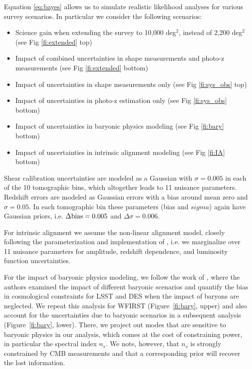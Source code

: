 Equation \ref{eq:bayes} allows us to simulate realistic likelihood analyses for various survey scenarios. In particular we consider the following scenarios:
\begin{itemize}
\item Science gain when extending the survey to 10,000 deg$^2$, instead of 2,200 deg$^2$ (see Fig \ref{fi:extended} top)
\item Impact of combined uncertainties in shape measurements and photo-z measurements (see Fig \ref{fi:extended} bottom)
\item Impact of uncertainties in shape measurements only (see Fig \ref{fi:sys_obs} top)
\item Impact of uncertainties in photo-z estimation only (see Fig \ref{fi:sys_obs} bottom)
\item Impact of uncertainties in baryonic physics modeling (see Fig \ref{fi:bary} bottom)
\item Impact of uncertainties in intrinsic alignment modeling (see Fig \ref{fi:IA} bottom)
\end{itemize}

Shear calibration uncertainties are modeled as a Gaussian with $\sigma=0.005$ in each of the 10 tomographic bins, which altogether leads to 11 nuisance parameters. Redshift errors are modeled as Gaussian errors with a bias around mean zero and $\sigma=0.05$. In each tomographic bin these parameters (bias and $sigma$) again have Gaussian priors, i.e. $\Delta \mathrm{bias}=0.005$ and $\Delta \sigma=0.006$.

For intrinsic alignment we assume the non-linear alignment model, closely following the parameterization and implementation of \cite{Krause2016}, i.e. we marginalize over 11 nuisance parameters for amplitude, redshift dependence, and luminosity function uncertainties.

For the impact of baryonic physics modeling, we follow the work of \cite{Eifler2015}, where the authors
examined the impact of different baryonic scenarios and quantify the bias in
cosmological constraints for LSST and DES when the impact of baryons are neglected. We repeat this analysis for WFIRST (Figure~\ref{fi:bary}, upper) and
also account for the uncertainties due to baryonic scenarios in a subsequent
analysis (Figure~\ref{fi:bary}, lower). There, we project out modes that are
sensitive to baryonic physics in our analysis, which comes at the cost of
constraining power, in particular the spectral index $n_s$. We note, however, that
$n_s$ is strongly constrained by CMB measurements and that a corresponding prior
will recover the lost information.


